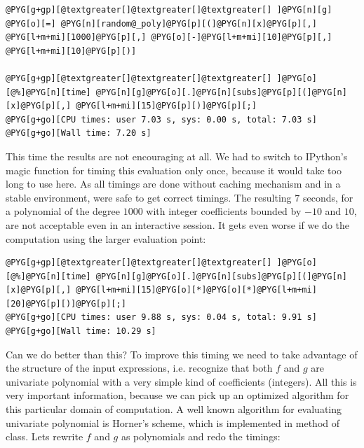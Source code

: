 \begin{Verbatim}[commandchars=@\[\]]
@PYG[g+gp][@textgreater[]@textgreater[]@textgreater[] ]@PYG[n][g] @PYG[o][=] @PYG[n][random@_poly]@PYG[p][(]@PYG[n][x]@PYG[p][,] @PYG[l+m+mi][1000]@PYG[p][,] @PYG[o][-]@PYG[l+m+mi][10]@PYG[p][,] @PYG[l+m+mi][10]@PYG[p][)]

@PYG[g+gp][@textgreater[]@textgreater[]@textgreater[] ]@PYG[o][@%]@PYG[n][time] @PYG[n][g]@PYG[o][.]@PYG[n][subs]@PYG[p][(]@PYG[n][x]@PYG[p][,] @PYG[l+m+mi][15]@PYG[p][)]@PYG[p][;]
@PYG[g+go][CPU times: user 7.03 s, sys: 0.00 s, total: 7.03 s]
@PYG[g+go][Wall time: 7.20 s]
\end{Verbatim}
\noindent
This time the results are not encouraging at all. We had to switch to IPython's  magic
function for timing this evaluation only once, because it would take too long to use 
here. As all timings are done without caching mechanism and in a stable environment, were safe
to get correct timings. The resulting $7$ seconds, for a polynomial of the degree $1000$ with
integer coefficients bounded by $-10$ and $10$, are not acceptable even in an interactive
session.  It gets even worse if we do the computation using the larger evaluation point:

\begin{Verbatim}[commandchars=@\[\]]
@PYG[g+gp][@textgreater[]@textgreater[]@textgreater[] ]@PYG[o][@%]@PYG[n][time] @PYG[n][g]@PYG[o][.]@PYG[n][subs]@PYG[p][(]@PYG[n][x]@PYG[p][,] @PYG[l+m+mi][15]@PYG[o][*]@PYG[o][*]@PYG[l+m+mi][20]@PYG[p][)]@PYG[p][;]
@PYG[g+go][CPU times: user 9.88 s, sys: 0.04 s, total: 9.91 s]
@PYG[g+go][Wall time: 10.29 s]
\end{Verbatim}
\noindent
Can we do better than this? To improve this timing we need to take advantage of the structure
of the input expressions, i.e. recognize that both $f$ and $g$ are univariate polynomial with
a very simple kind of coefficients (integers). All this is very important information, because
we can pick up an optimized algorithm for this particular domain of computation. A well known
algorithm for evaluating univariate polynomial is Horner's scheme, which is implemented in
\href{http://docs.python.org/library/functions.html\#eval}{} method of  class. Lets rewrite $f$ and $g$ as polynomials and redo
the timings:

